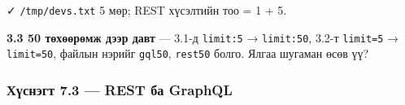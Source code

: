 \begin{Shaded}
\begin{Highlighting}[]
 \KeywordTok{\textbackslash{}}
   \KeywordTok{|}  \OperatorTok{\textgreater{}}
\KeywordTok{;} 
   \KeywordTok{\textbackslash{}}
     \StringTok{:}\StringTok{,}\StringTok{:}\StringTok{,}\StringTok{:}
 \OperatorTok{\textless{}} \NormalTok{) }\OperatorTok{\textgreater{}} 
\KeywordTok{\&\&} 
\end{Highlighting}
\end{Shaded}

✓ \texttt{/tmp/devs.txt} 5 мөр; REST хүсэлтийн тоо = 1 + 5.

\textbf{3.3 50 төхөөрөмж дээр давт} --- 3.1-д \texttt{limit:5} → \texttt{limit:50}, 3.2-т \texttt{limit=5} → \texttt{limit=50}, файлын нэрийг \texttt{gql50}, \texttt{rest50} болго. Ялгаа шугаман өсөв үү?

\hypertarget{ux445ux4afux441ux43dux44dux433ux442-7.3-rest-ux431ux430-graphql}{%
\subsubsection{Хүснэгт 7.3 --- REST ба GraphQL}\label{ux445ux4afux441ux43dux44dux433ux442-7.3-rest-ux431ux430-graphql}}

